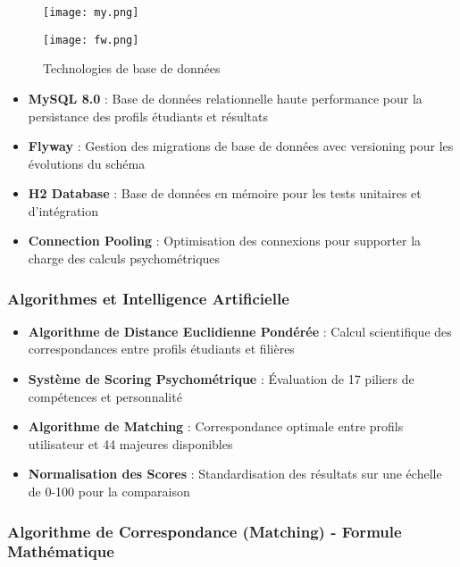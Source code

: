 \documentclass[12pt,a4paper]{report}
\begin{document}
\begin{figure}[H]
\centering
\begin{minipage}{0.3\textwidth}
\centering
\texttt{[image: my.png]}
\end{minipage}
\hfill
\begin{minipage}{0.3\textwidth}
\centering
\texttt{[image: fw.png]}
\end{minipage}
\hfill

\caption{Technologies de base de données}
\label{fig:database-tech}
\end{figure}

\begin{itemize}
    \item \textbf{MySQL 8.0} : Base de données relationnelle haute performance pour la persistance des profils étudiants et résultats
    \item \textbf{Flyway} : Gestion des migrations de base de données avec versioning pour les évolutions du schéma
    \item \textbf{H2 Database} : Base de données en mémoire pour les tests unitaires et d'intégration
    \item \textbf{Connection Pooling} : Optimisation des connexions pour supporter la charge des calculs psychométriques
\end{itemize}

\subsubsection{Algorithmes et Intelligence Artificielle}

\begin{itemize}
    \item \textbf{Algorithme de Distance Euclidienne Pondérée} : Calcul scientifique des correspondances entre profils étudiants et filières
    \item \textbf{Système de Scoring Psychométrique} : Évaluation de 17 piliers de compétences et personnalité
    \item \textbf{Algorithme de Matching} : Correspondance optimale entre profils utilisateur et 44 majeures disponibles
    \item \textbf{Normalisation des Scores} : Standardisation des résultats sur une échelle de 0-100 pour la comparaison
\end{itemize}

\subsubsection{Algorithme de Correspondance (Matching) - Formule Mathématique}
\end{document}
